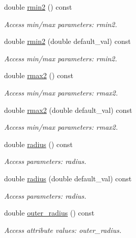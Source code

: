\begin{DoxyCompactItemize}
double \hyperlink{struct_d_d4hep_1_1_x_m_l_1_1_dimension_a32157c205bff81aedbdb81bdca08e615}{rmin2} () const
\begin{DoxyCompactList}\small\item\em Access min/max parameters\+: rmin2. \end{DoxyCompactList}\item 
double \hyperlink{struct_d_d4hep_1_1_x_m_l_1_1_dimension_a1c045bf27fd8799446fa080f30147e3f}{rmin2} (double default\+\_\+val) const
\begin{DoxyCompactList}\small\item\em Access min/max parameters\+: rmin2. \end{DoxyCompactList}\item 
double \hyperlink{struct_d_d4hep_1_1_x_m_l_1_1_dimension_a165e140ba68be7de60c20fec5a785980}{rmax2} () const
\begin{DoxyCompactList}\small\item\em Access min/max parameters\+: rmax2. \end{DoxyCompactList}\item 
double \hyperlink{struct_d_d4hep_1_1_x_m_l_1_1_dimension_a1dc3d4e014e5bc53d68e6d4ceb6921f3}{rmax2} (double default\+\_\+val) const
\begin{DoxyCompactList}\small\item\em Access min/max parameters\+: rmax2. \end{DoxyCompactList}\item 
double \hyperlink{struct_d_d4hep_1_1_x_m_l_1_1_dimension_ad7c2f1de23e1c26634c63ef0251d4615}{radius} () const
\begin{DoxyCompactList}\small\item\em Access parameters\+: radius. \end{DoxyCompactList}\item 
double \hyperlink{struct_d_d4hep_1_1_x_m_l_1_1_dimension_a8aa98b87c9fc624b475bbd209d27c903}{radius} (double default\+\_\+val) const
\begin{DoxyCompactList}\small\item\em Access parameters\+: radius. \end{DoxyCompactList}\item 
double \hyperlink{struct_d_d4hep_1_1_x_m_l_1_1_dimension_abf65cc7165b2abbf87b3d482ad7a433e}{outer\+\_\+radius} () const
\begin{DoxyCompactList}\small\item\em Access attribute values\+: outer\+\_\+radius. \end{DoxyCompactList}\item 

\end{DoxyCompactItemize}
